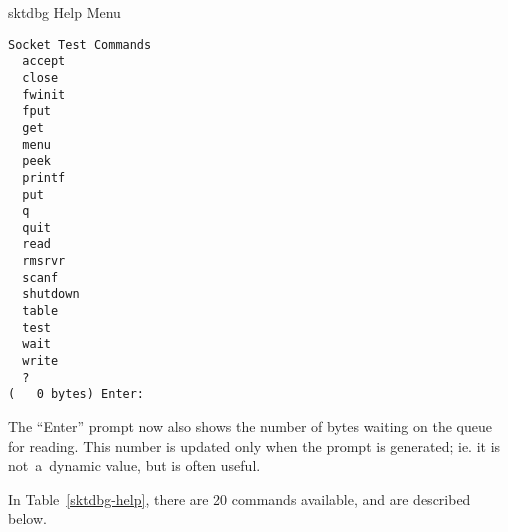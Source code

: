 \documentclass[12pt]{article}
\begin{document}
\begin{table}[thb]
  \begin{center}
  \caption{sktdbg Help Menu}
  \label{sktdbg-help}
  \begin{verbatim}
Socket Test Commands
  accept
  close
  fwinit
  fput
  get
  menu
  peek
  printf
  put
  q
  quit
  read
  rmsrvr
  scanf
  shutdown
  table
  test
  wait
  write
  ?
(   0 bytes) Enter: 
  \end{verbatim}
  \end{center}
\end{table}

The ``Enter'' prompt now also shows the number of bytes waiting on the queue
for reading.  This number is updated only when the prompt is generated; ie. it
is not~a~dynamic value, but is often useful.

In Table~\ref{sktdbg-help}, there are 20 commands available, and are
described below.
\end{document}
